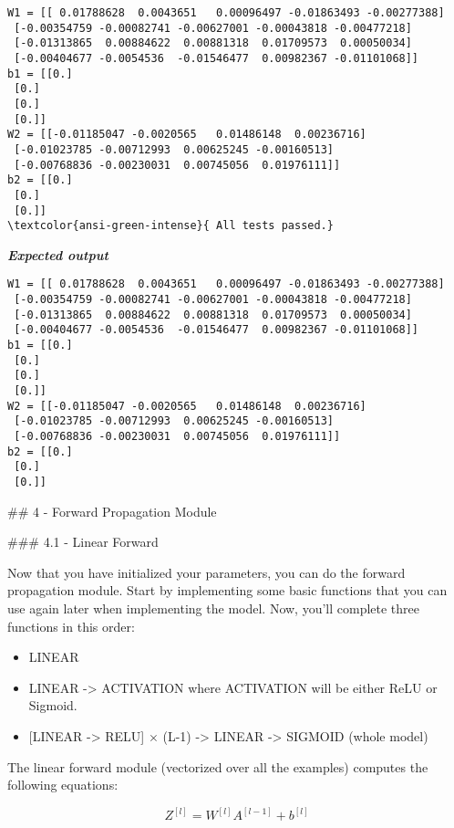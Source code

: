 \documentclass[11pt]{article}
\providecommand{\tightlist}{%
      \setlength{\itemsep}{0pt}\setlength{\parskip}{0pt}}
\begin{document}
    \begin{Verbatim}[commandchars=\\\{\}]
W1 = [[ 0.01788628  0.0043651   0.00096497 -0.01863493 -0.00277388]
 [-0.00354759 -0.00082741 -0.00627001 -0.00043818 -0.00477218]
 [-0.01313865  0.00884622  0.00881318  0.01709573  0.00050034]
 [-0.00404677 -0.0054536  -0.01546477  0.00982367 -0.01101068]]
b1 = [[0.]
 [0.]
 [0.]
 [0.]]
W2 = [[-0.01185047 -0.0020565   0.01486148  0.00236716]
 [-0.01023785 -0.00712993  0.00625245 -0.00160513]
 [-0.00768836 -0.00230031  0.00745056  0.01976111]]
b2 = [[0.]
 [0.]
 [0.]]
\textcolor{ansi-green-intense}{ All tests passed.}
    \end{Verbatim}

    \textbf{\emph{Expected output}}

\begin{verbatim}
W1 = [[ 0.01788628  0.0043651   0.00096497 -0.01863493 -0.00277388]
 [-0.00354759 -0.00082741 -0.00627001 -0.00043818 -0.00477218]
 [-0.01313865  0.00884622  0.00881318  0.01709573  0.00050034]
 [-0.00404677 -0.0054536  -0.01546477  0.00982367 -0.01101068]]
b1 = [[0.]
 [0.]
 [0.]
 [0.]]
W2 = [[-0.01185047 -0.0020565   0.01486148  0.00236716]
 [-0.01023785 -0.00712993  0.00625245 -0.00160513]
 [-0.00768836 -0.00230031  0.00745056  0.01976111]]
b2 = [[0.]
 [0.]
 [0.]]
\end{verbatim}

    \#\# 4 - Forward Propagation Module

\#\#\# 4.1 - Linear Forward

Now that you have initialized your parameters, you can do the forward
propagation module. Start by implementing some basic functions that you
can use again later when implementing the model. Now, you'll complete
three functions in this order:

\begin{itemize}
\tightlist
\item
  LINEAR
\item
  LINEAR -\textgreater{} ACTIVATION where ACTIVATION will be either ReLU
  or Sigmoid.
\item
  {[}LINEAR -\textgreater{} RELU{]} \(\times\) (L-1) -\textgreater{}
  LINEAR -\textgreater{} SIGMOID (whole model)
\end{itemize}

The linear forward module (vectorized over all the examples) computes
the following equations:

\[Z^{[l]} = W^{[l]}A^{[l-1]} +b^{[l]}\tag{4}\]
\end{document}
